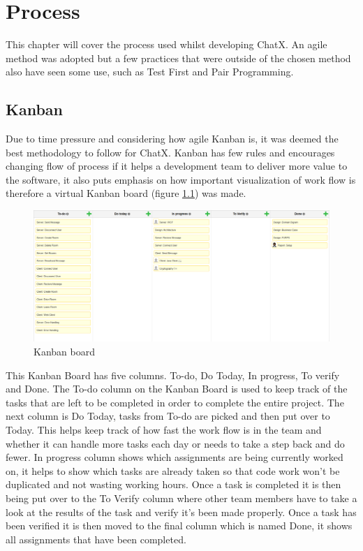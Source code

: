 \chapter{Process}
This chapter will cover the process used whilst developing ChatX. An agile method was adopted but a few practices that were outside of the chosen method also have seen some use, such as Test First and Pair Programming.

\section{Kanban}
Due to time pressure and considering how agile Kanban is, it was deemed the best methodology to follow for ChatX. Kanban has few rules and encourages changing flow of process if it helps a development team to deliver more value to the software, it also puts emphasis on how important visualization of work flow is therefore a virtual Kanban board (figure \ref{fig:KanbanBoard}) was made.  %

\begin{figure}[H]
\centering
\includegraphics[width=0.7\linewidth]{"img/Kanban Board"}
\caption{Kanban board}
\label{fig:KanbanBoard}
\end{figure}

This Kanban Board has five columns. To-do, Do Today, In progress, To verify and Done. 
The To-do column on the Kanban Board is used to keep track of the tasks that are left to be completed in order to complete the entire project. The next column is Do Today, tasks from To-do are picked and then put over to Today. This helps keep track of how fast the work flow is in the team and whether it can handle more tasks each day or needs to take a step back and do fewer. In progress column shows which assignments are being currently worked on, it helps to show which tasks are already taken so that code work won't be duplicated and not wasting working hours. Once a task is completed it is then being put over to the To Verify column where other team members have to take a look at the results of the task and verify it's been made properly. Once a task has been verified it is then moved to the final column which is named Done, it shows all assignments that have been completed. %

